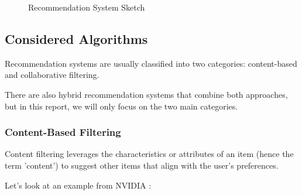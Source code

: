 \begin{figure}[H]
    \centering
    \caption{Recommendation System Sketch}
    \label{fig:recommendation-system-sketch}
\end{figure}

\subsection{Considered Algorithms}

Recommendation systems are usually classified into two categories: content-based and collaborative filtering.

There are also hybrid recommendation systems that combine both approaches, but in this report, we will only focus on the two main categories.

\subsubsection*{Content-Based Filtering}

Content filtering leverages the characteristics or attributes of an item (hence the term 'content') to suggest other items that align with the user's preferences.

Let's look at an example from NVIDIA \cite{nvidia}:

